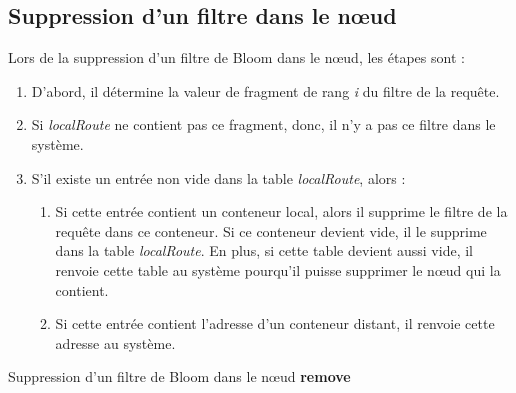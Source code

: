 \documentclass[a4paper,11pt]{report}
\begin{document}
\subsection{Suppression d'un filtre dans le nœud}
	Lors de la suppression d'un filtre de Bloom dans le nœud, les étapes sont : 
	\begin{enumerate}
		\item D'abord, il détermine la valeur de fragment de rang \textit{i} du filtre de la requête.
		\item Si \textit{localRoute} ne contient pas ce fragment, donc, il n'y a pas ce filtre dans le système.
		\item S'il existe un entrée non vide dans la table \textit{localRoute}, alors : 
		\begin{enumerate}
			\item Si cette entrée contient un conteneur local, alors il supprime le filtre de la requête dans ce conteneur. Si ce conteneur devient vide, il le supprime dans la table \textit{localRoute}. En plus, si cette table devient aussi vide, il renvoie cette table au système pourqu'il puisse supprimer le nœud qui la contient.
			\item Si cette entrée contient l'adresse d'un conteneur distant, il renvoie cette adresse au système.
		\end{enumerate}
	\end{enumerate}

\begin{algorithme}
	Suppression d'un filtre de Bloom dans le nœud \textbf{remove}
\end{algorithme}
\end{document}
